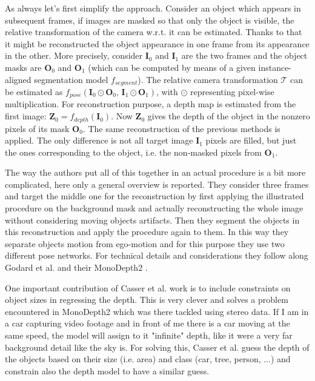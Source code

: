 As always let's first simplify the approach.
Consider an object which appears in subsequent frames, if images are masked so that only the object is visible, the relative transformation of the camera w.r.t. it can be estimated.
Thanks to that it might be reconstructed the object appearance in one frame from its appearance in the other.
More precisely, consider $\mathbf{I}_{0}$ and $\mathbf{I}_{1}$ are the two frames and the object masks are $\mathbf{O}_{0}$ and $\mathbf{O}_{1}$ (which can be computed by means of a given instance-aligned segmentation model $f_{segment}$).
The relative camera transformation $\mathcal{T}$ can be estimated as $f_{pose}(\mathbf{I}_{0} \odot \mathbf{O}_{0}, \, \mathbf{I}_{1} \odot \mathbf{O}_{1})$, with $\odot$ representing pixel-wise multiplication.
For reconstruction purpose, a depth map is estimated from the first image: $\mathbf{Z}_{0} = f_{depth}(\mathbf{I}_{0})$.
Now $\mathbf{Z}_{0}$ gives the depth of the object in the nonzero pixels of its mask $\mathbf{O}_{0}$.
The same reconstruction of the previous methods is applied.
The only difference is not all target image $\mathbf{I}_{1}$ pixels are filled, but just the ones corresponding to the object, i.e. the non-masked pixels from $\mathbf{O}_{1}$.

The way the authors put all of this together in an actual procedure is a bit more complicated, here only a general overview is reported.
They consider three frames and target the middle one for the reconstruction by first applying the illustrated procedure on the background mask and actually reconstructing the whole image without considering moving objects artifacts.
Then they segment the objects in this reconstruction and apply the procedure again to them.
In this way they separate objects motion from ego-motion and for this purpose they use two different pose networks.
For technical details and considerations they follow along Godard et al. and their MonoDepth2 \cite{MonoDepth2}.

One important contribution of Casser et al. work is to include constraints on object sizes in regressing the depth.
This is very clever and solves a problem encountered in MonoDepth2 which was there tackled using stereo data.
If I am in a car capturing video footage and in front of me there is a car moving at the same speed, the model will assign to it "infinite" depth, like it were a very far background detail like the sky is.
For solving this, Casser et al. guess the depth of the objects based on their size (i.e. area) and class (car, tree, person, ...) and constrain also the depth model to have a similar guess.

